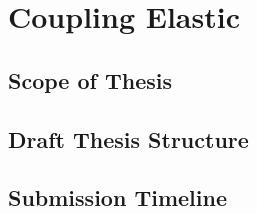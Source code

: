 \chapter{\label{ch:4-coupled}Coupling Elastic} 

\minitoc

\section{Scope of Thesis}

\section{Draft Thesis Structure}

\section{Submission Timeline}
